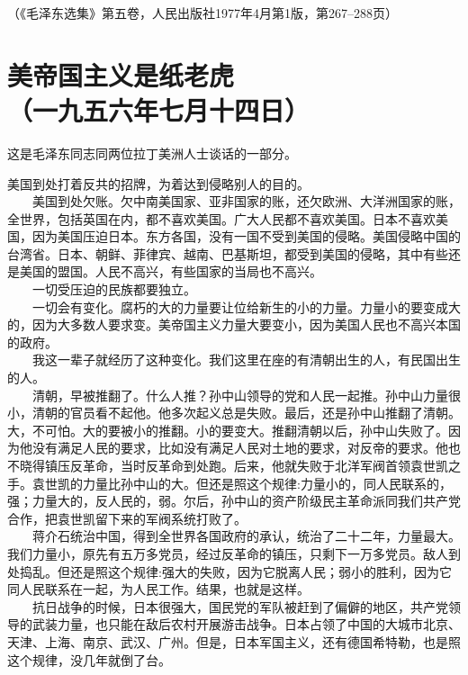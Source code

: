 \documentclass[cn,11pt,chinese]{elegantbook}
\def\myformat#1{\hfil\hfil #1}
\begin{document}
\begin{flushright}（《毛泽东选集》第五卷，人民出版社1977年4月第1版，第267--288页） \end{flushright}
\newpage\section*{\myformat{美帝国主义是纸老虎}\\\myformat{（一九五六年七月十四日）}}
\begin{introduction}\item  这是毛泽东同志同两位拉丁美洲人士谈话的一部分。\end{introduction}
美国到处打着反共的招牌，为着达到侵略别人的目的。\\
　　美国到处欠账。欠中南美国家、亚非国家的账，还欠欧洲、大洋洲国家的账，全世界，包括英国在内，都不喜欢美国。广大人民都不喜欢美国。日本不喜欢美国，因为美国压迫日本。东方各国，没有一国不受到美国的侵略。美国侵略中国的台湾省。日本、朝鲜、菲律宾、越南、巴基斯坦，都受到美国的侵略，其中有些还是美国的盟国。人民不高兴，有些国家的当局也不高兴。\\
　　一切受压迫的民族都要独立。\\
　　一切会有变化。腐朽的大的力量要让位给新生的小的力量。力量小的要变成大的，因为大多数人要求变。美帝国主义力量大要变小，因为美国人民也不高兴本国的政府。\\
　　我这一辈子就经历了这种变化。我们这里在座的有清朝出生的人，有民国出生的人。\\
　　清朝，早被推翻了。什么人推？孙中山领导的党和人民一起推。孙中山力量很小，清朝的官员看不起他。他多次起义总是失败。最后，还是孙中山推翻了清朝。大，不可怕。大的要被小的推翻。小的要变大。推翻清朝以后，孙中山失败了。因为他没有满足人民的要求，比如没有满足人民对土地的要求，对反帝的要求。他也不晓得镇压反革命，当时反革命到处跑。后来，他就失败于北洋军阀首领袁世凯之手。袁世凯的力量比孙中山的大。但还是照这个规律:力量小的，同人民联系的，强；力量大的，反人民的，弱。尔后，孙中山的资产阶级民主革命派同我们共产党合作，把袁世凯留下来的军阀系统打败了。\\
　　蒋介石统治中国，得到全世界各国政府的承认，统治了二十二年，力量最大。我们力量小，原先有五万多党员，经过反革命的镇压，只剩下一万多党员。敌人到处捣乱。但还是照这个规律:强大的失败，因为它脱离人民；弱小的胜利，因为它同人民联系在一起，为人民工作。结果，也就是这样。\\
　　抗日战争的时候，日本很强大，国民党的军队被赶到了偏僻的地区，共产党领导的武装力量，也只能在敌后农村开展游击战争。日本占领了中国的大城市北京、天津、上海、南京、武汉、广州。但是，日本军国主义，还有德国希特勒，也是照这个规律，没几年就倒了台。\\
\end{document}
